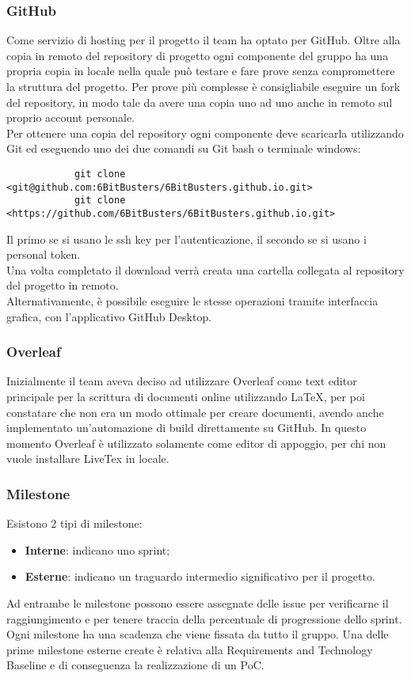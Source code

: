 \subsubsection{GitHub}
Come servizio di hosting per il progetto il team ha optato per GitHub. Oltre
alla copia in remoto del repository di progetto ogni componente del gruppo ha
una propria copia in locale nella quale può testare e fare prove senza
compromettere la struttura del progetto. Per prove più complesse è
consigliabile eseguire un fork del repository, in modo tale da avere una copia
uno ad uno anche in remoto sul proprio account personale.\\ Per ottenere una
copia del repository ogni componente deve scaricarla utilizzando Git ed
eseguendo uno dei due comandi su Git bash o terminale windows:
\begin{verbatim}
            git clone <git@github.com:6BitBusters/6BitBusters.github.io.git>
            git clone <https://github.com/6BitBusters/6BitBusters.github.io.git>
        \end{verbatim}
Il primo se si usano le ssh key per l'autenticazione, il secondo se si usano i
personal token.\\ Una volta completato il download verrà creata una cartella
collegata al repository del progetto in remoto.\\ Alternativamente, è possibile
eseguire le stesse operazioni tramite interfaccia grafica, con l'applicativo
GitHub Desktop.

\subsubsection{Overleaf}
Inizialmente il team aveva deciso ad utilizzare Overleaf come text editor
principale per la scrittura di documenti online utilizzando LaTeX, per poi
constatare che non era un modo ottimale per creare documenti, avendo anche
implementato un'automazione di build direttamente su GitHub. In questo momento
Overleaf è utilizzato solamente come editor di appoggio, per chi non vuole
installare LiveTex in locale.

\subsubsection{Milestone}
Esistono 2 tipi di milestone:
\begin{itemize}
    \item \textbf{Interne}: indicano uno sprint;
    \item \textbf{Esterne}: indicano un traguardo intermedio significativo per il progetto.
\end{itemize}
Ad entrambe le milestone possono essere assegnate delle issue per verificarne il raggiungimento e per tenere traccia
della percentuale di progressione dello sprint.
Ogni milestone ha una scadenza che viene fissata da tutto il gruppo. Una delle prime milestone esterne create è
relativa alla Requirements and Technology Baseline e di conseguenza la realizzazione di un PoC.

